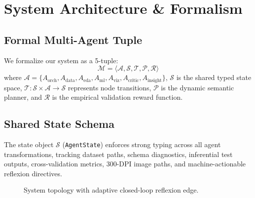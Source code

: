 \documentclass[10pt,journal,compsoc]{IEEEtran}
\begin{document}
\section{System Architecture \& Formalism}

\subsection{Formal Multi-Agent Tuple}
We formalize our system as a 5-tuple:
\begin{equation}
\mathcal{M} = \langle \mathcal{A}, \mathcal{S}, \mathcal{T}, \mathcal{P}, \mathcal{R} \rangle
\end{equation}
where $\mathcal{A} = \{A_{\text{orch}}, A_{\text{data}}, A_{\text{eda}}, A_{\text{ml}}, A_{\text{viz}}, A_{\text{critic}}, A_{\text{insight}}\}$, $\mathcal{S}$ is the shared typed state space, $\mathcal{T}: \mathcal{S} \times \mathcal{A} \rightarrow \mathcal{S}$ represents node transitions, $\mathcal{P}$ is the dynamic semantic planner, and $\mathcal{R}$ is the empirical validation reward function.

\subsection{Shared State Schema}
The state object $\mathcal{S}$ (\texttt{AgentState}) enforces strong typing across all agent transformations, tracking dataset paths, schema diagnostics, inferential test outputs, cross-validation metrics, 300-DPI image paths, and machine-actionable reflexion directives.

\begin{figure}[t]
\centering
{}
\caption{System topology with adaptive closed-loop reflexion edge.}
\label{fig:graph_topology}
\end{figure}
\end{document}

